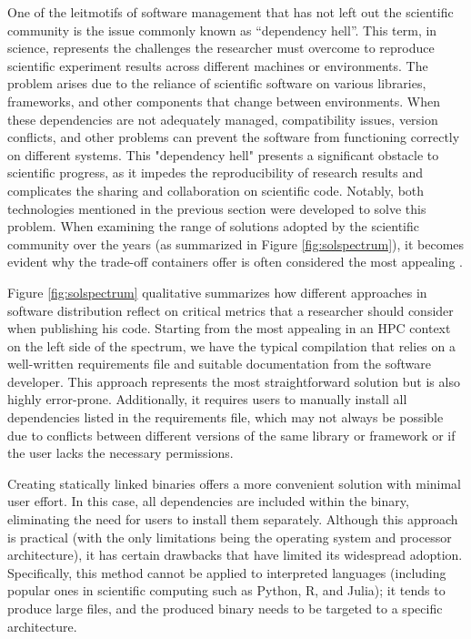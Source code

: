 One of the leitmotifs of software management that has not left out the
scientific community is the issue commonly known as ``dependency hell''.
This term,  in science, represents the challenges the researcher must overcome
to reproduce scientific experiment results across different machines or
environments.
The problem arises due to the reliance of scientific software on various
libraries, frameworks, and other components that change between environments.
When these dependencies are not adequately managed, compatibility issues,
version conflicts, and other problems can prevent the software from functioning
correctly on different systems.
This "dependency hell" presents a significant obstacle to scientific progress,
as it impedes the reproducibility of research results and complicates the
sharing and collaboration on scientific code.
Notably, both technologies mentioned in the previous section were developed to
solve this problem.
When examining the range of solutions adopted by the scientific community over
the years (as summarized in Figure \ref{fig:solspectrum}), it becomes evident
why the trade-off containers offer is often considered the most appealing
\cite{sarusso}.

Figure \ref{fig:solspectrum}  qualitative summarizes how different approaches in
software distribution reflect on critical metrics that a researcher should
consider when publishing his code. Starting from the most appealing in an HPC
context on the left side of the spectrum, we have the typical compilation that
relies on a well-written requirements file and suitable documentation from the
software developer. This approach represents the most straightforward solution
but is also highly error-prone. Additionally, it requires users to manually
install all dependencies listed in the requirements file, which may not always
be possible due to conflicts between different versions of the same library or
framework or if the user lacks the necessary permissions.

Creating statically linked binaries offers a more convenient solution with
minimal user effort. In this case, all dependencies are included within the
binary, eliminating the need for users to install them separately.
Although this approach is practical (with the only limitations being the
operating system and processor architecture), it has certain drawbacks that have
limited its widespread adoption.
Specifically, this method cannot be applied to interpreted languages (including
popular ones in scientific computing such as Python, R, and Julia); it tends to
produce large files, and the produced binary needs to be targeted to a specific
architecture.

